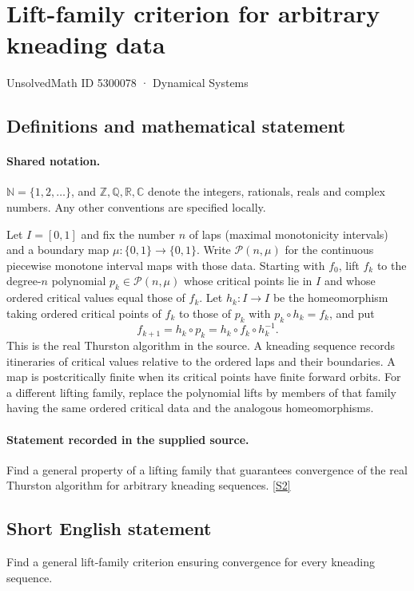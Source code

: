 \documentclass[11pt]{article}
\newcommand{\sref}[2]{\hyperlink{source:#1:#2}{[S#2]}}
\begin{document}
\setcounter{section}{5300077}
\section{Lift-family criterion for arbitrary kneading data}\label{5300078}
{\small\sffamily UnsolvedMath ID 5300078 · Dynamical Systems}
\subsection{Definitions and mathematical statement}

\paragraph{Shared notation.}$\mathbb N=\{1,2,\ldots\}$, and $\mathbb Z,\mathbb Q,\mathbb R,\mathbb C$ denote the integers, rationals, reals and complex numbers. Any other conventions are specified locally.


Let $I=[0,1]$ and fix the number $n$ of laps (maximal monotonicity intervals) and a boundary map $\mu:\{0,1\}\to\{0,1\}$. Write $\mathcal P(n,\mu)$ for the continuous piecewise monotone interval maps with those data. Starting with $f_0$, lift $f_k$ to the degree-$n$ polynomial $p_k\in\mathcal P(n,\mu)$ whose critical points lie in $I$ and whose ordered critical values equal those of $f_k$. Let $h_k:I\to I$ be the homeomorphism taking ordered critical points of $f_k$ to those of $p_k$ with $p_k\circ h_k=f_k$, and put
\[f_{k+1}=h_k\circ p_k=h_k\circ f_k\circ h_k^{-1}.\]
This is the real Thurston algorithm in the source. A kneading sequence records itineraries of critical values relative to the ordered laps and their boundaries. A map is postcritically finite when its critical points have finite forward orbits. For a different lifting family, replace the polynomial lifts by members of that family having the same ordered critical data and the analogous homeomorphisms.
\paragraph{Statement recorded in the supplied source.}
Find a general property of a lifting family that guarantees convergence of the real Thurston algorithm for arbitrary kneading sequences. \sref{5300078}{2}
\subsection{Short English statement}
Find a general lift-family criterion ensuring convergence for every kneading sequence.
\end{document}
